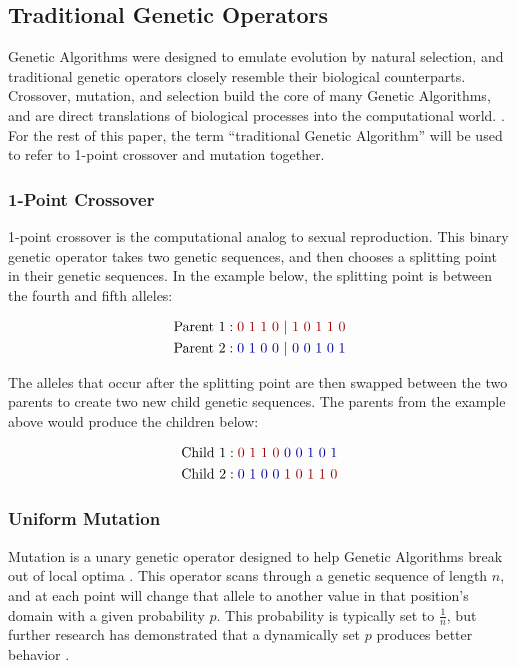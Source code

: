\subsection*{Traditional Genetic Operators}
Genetic Algorithms were designed to emulate evolution by natural selection, and traditional genetic operators closely resemble their biological counterparts. Crossover, mutation, and selection build the core of many Genetic Algorithms, and are direct translations of biological processes into the computational world. \cite{Russell10}. For the rest of this paper, the term ``traditional Genetic Algorithm'' will be used to refer to 1-point crossover and mutation together.

\subsubsection*{1-Point Crossover}
1-point crossover is the computational analog to sexual reproduction. This binary genetic operator takes two genetic sequences, and then chooses a splitting point in their genetic sequences. In the example below, the splitting point is between the fourth and fifth alleles:

\begin{align*}
\text{Parent 1} &: {\color{myred}0~1~1~0~}|{\color{myred}~1~0~1~1~0} 			\\
\text{Parent 2} &: {\color{myblue}0~1~0~0~}|{\color{myblue}~0~0~1~0~1} 	\\		
\end{align*}

\noindent The alleles that occur after the splitting point are then swapped between the two parents to create two new child genetic sequences. The parents from the example above would produce the children below:

\begin{align*}
\text{Child 1} &: {\color{myred}0~1~1~0}{\color{myblue}~0~0~1~0~1} 			\\  
\text{Child 2} &: {\color{myblue}0~1~0~0}{\color{myred}~1~0~1~1~0} 		
\end{align*}

\subsubsection*{Uniform Mutation}
Mutation is a unary genetic operator designed to help Genetic Algorithms break out of local optima \cite{Russell10}. This operator scans through a genetic sequence of length $n$, and at each point will change that allele to another value in that position's domain with a given probability $p$. This probability is typically set to $\frac{1}{n}$, but further research has demonstrated that a dynamically set $p$ produces better behavior \cite{Back93}.

